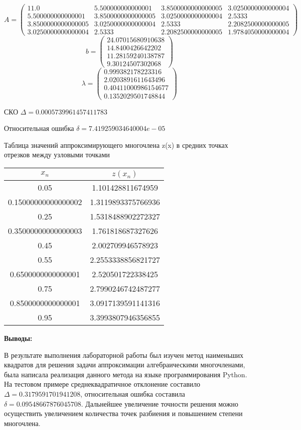 \documentclass [12pt]{article}
\begin{document}
\[
  A =
  \begin{pmatrix}
    11.0 & 5.500000000000001 & 3.8500000000000005 & 3.0250000000000004\\
    5.500000000000001 & 3.8500000000000005 & 3.0250000000000004 & 2.5333\\
    3.8500000000000005 & 3.0250000000000004 & 2.5333 & 2.2082500000000005\\
    3.0250000000000004 & 2.5333 & 2.2082500000000005 & 1.9784050000000004
  \end{pmatrix}
\]
\[
  b =
  \begin{pmatrix}
    24.07015680910638 \\
    14.8400426642202 \\
    11.28159240138787 \\
    9.30124507302068
  \end{pmatrix}
\]
\[
  \lambda =
  \begin{pmatrix}
    0.999382178223316 \\
    2.0203891611643496 \\
    0.40411000986154677 \\
    0.1352029501748844
  \end{pmatrix}
\]

СКО $\Delta = 0.0005739961457411783$

Относительная ошибка $\delta = 7.419259034640004e-05$

Таблица значений аппроксимирующего многочлена z(x) в средних точках отрезков между узловыми точками

\begin{center}
\begin{tabular}{|c|c|}
    \hline
    $x_n$ & $z(x_n)$ \\ \hline
    0.05 & 1.101428811674959 \\ \hline
    0.15000000000000002 & 1.3119893375766936 \\ \hline
    0.25 & 1.5318488902272327 \\ \hline
    0.35000000000000003 & 1.761818687327626 \\ \hline
    0.45 & 2.002709946578923 \\ \hline
    0.55 & 2.2553338856821727 \\ \hline
    0.6500000000000001 & 2.520501722338425 \\ \hline
    0.75 & 2.7990246742487277 \\ \hline
    0.8500000000000001 & 3.0917139591141316 \\ \hline
    0.95 & 3.3993807946356855 \\ \hline
\end{tabular}
\end{center}

\textbf{Выводы:}

В результате выполнения лабораторной работы был изучен метод наименьших квадратов для решения задачи аппроксимации алгебраическими многочленами, была написала реализация данного метода на языке программирования Python. На тестовом примере среднеквадратичное отклонение составило $\Delta = 0.3179591701941208$, относительная ошибка составила $\delta = 0.09548667876045708$. Дальнейшее увеличение точности решения можно осуществить увеличением количества точек разбиения и повышением степени многочлена.
\end{document}
